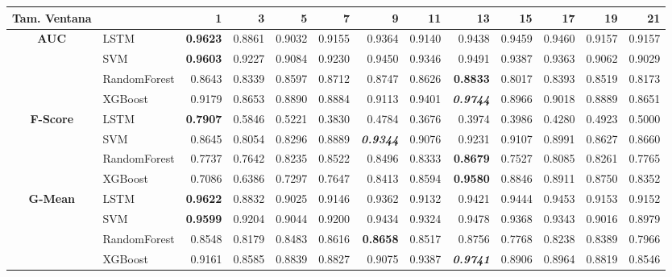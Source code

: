 \begin{table}[H]
	\centering
	\begin{adjustbox}{max width=12cm}
		\begin{tabular}{|c|l|r|r|r|r|r|r|r|r|r|r|r|}
			
			\hline
			\textbf{Tam. Ventana}&         &      1  &      3  &      5  &      7  &      9  &      11 &      13 &      15 &      17 &      19 &      21 \\
			\hline
			\textbf{AUC} & LSTM &  \textbf{0.9623} &  0.8861 &  0.9032 &  0.9155 &  0.9364 &  0.9140 &  0.9438 &  0.9459 &  0.9460 &  0.9157 &  0.9157 \\
			& SVM &  \textbf{0.9603} &  0.9227 &  0.9084 &  0.9230 &  0.9450 &  0.9346 &  0.9491 &  0.9387 &  0.9363 &  0.9062 &  0.9029 \\
			& RandomForest &  0.8643 &  0.8339 &  0.8597 &  0.8712 &  0.8747 &  0.8626 &  \textbf{0.8833} &  0.8017 &  0.8393 &  0.8519 &  0.8173 \\
			& XGBoost &  0.9179 &  0.8653 &  0.8890 &  0.8884 &  0.9113 &  0.9401 &  \textit{\textbf{0.9744}} &  0.8966 &  0.9018 &  0.8889 &  0.8651 \\
			\hline
			\textbf{F-Score} & LSTM &  \textbf{0.7907} &  0.5846 &  0.5221 &  0.3830 &  0.4784 &  0.3676 &  0.3974 &  0.3986 &  0.4280 &  0.4923 &  0.5000 \\
			& SVM &  0.8645 &  0.8054 &  0.8296 &  0.8889 &  \textit{\textbf{0.9344}} &  0.9076 &  0.9231 &  0.9107 &  0.8991 &  0.8627 &  0.8660 \\
			& RandomForest &  0.7737 &  0.7642 &  0.8235 &  0.8522 &  0.8496 &  0.8333 &  \textbf{0.8679} &  0.7527 &  0.8085 &  0.8261 &  0.7765 \\
			& XGBoost &  0.7086 &  0.6386 &  0.7297 &  0.7647 &  0.8413 &  0.8594 &  \textbf{0.9580} &  0.8846 &  0.8911 &  0.8750 &  0.8352 \\
			\hline
			\textbf{G-Mean} & LSTM &  \textbf{0.9622} &  0.8832 &  0.9025 &  0.9146 &  0.9362 &  0.9132 &  0.9421 &  0.9444 &  0.9453 &  0.9153 &  0.9152 \\
			& SVM &  \textbf{0.9599} &  0.9204 &  0.9044 &  0.9200 &  0.9434 &  0.9324 &  0.9478 &  0.9368 &  0.9343 &  0.9016 &  0.8979 \\
			& RandomForest &  0.8548 &  0.8179 &  0.8483 &  0.8616 &  \textbf{0.8658} &  0.8517 &  0.8756 &  0.7768 &  0.8238 &  0.8389 &  0.7966 \\
			& XGBoost &  0.9161 &  0.8585 &  0.8839 &  0.8827 &  0.9075 &  0.9387 &  \textit{\textbf{0.9741}} &  0.8906 &  0.8964 &  0.8819 &  0.8546 \\

\end{tabular}
\end{adjustbox}
\end{table}
